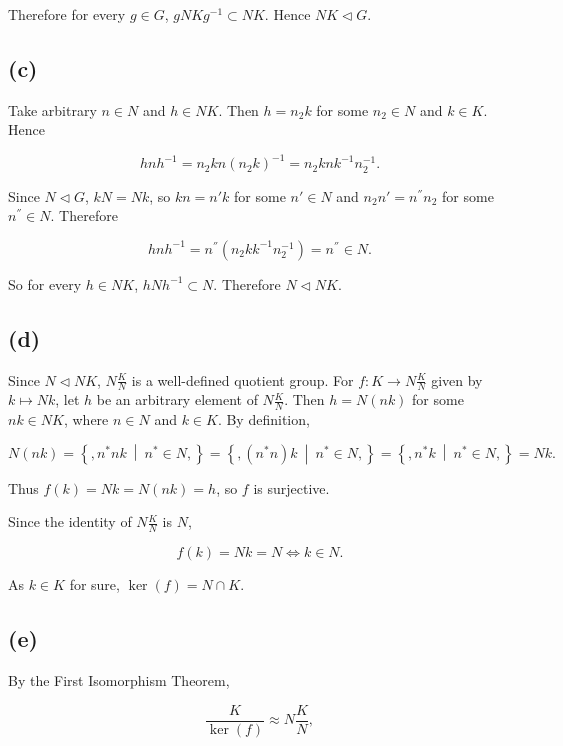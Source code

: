 Therefore for every \(g \in G\), \(gNKg^{- 1} \subset NK\). Hence \(NK \lhd G\).

\subsection{(c)}

Take arbitrary \(n \in N\) and \(h \in NK\). Then \(h = n_{2}k\) for some \(n_{2} \in N\) and \(k \in K\). Hence

\[hnh^{- 1} = n_{2}k{n\left( {n_{2}k} \right)}^{- 1} = n_{2}knk^{- 1}n_{2}^{- 1}.\]

Since \(N \lhd G\), \(kN = Nk\), so \(kn = n'k\) for some \(n' \in N\) and \(n_{2}n' = n^{''}n_{2}\) for some \(n^{''} \in N\). Therefore

\[hnh^{- 1} = n^{''}\left( {n_{2}kk^{- 1}n_{2}^{- 1}} \right) = n^{''} \in N.\]

So for every \(h \in NK\), \(hNh^{- 1} \subset N\). Therefore \(N \lhd NK\).

\subsection{(d)}

Since \(N \lhd NK\), \(N\frac{K}{N}\) is a well-defined quotient group. For \(f:K\rightarrow N\frac{K}{N}\) given by \(k\mapsto Nk\), let \(h\) be an arbitrary element of \(N\frac{K}{N}\). Then \(h = N\left( {nk} \right)\) for some \(nk \in NK\), where \(n \in N\) and \(k \in K\). By definition,

\[N\left( {nk} \right) = \left\{ ,n^{\ast}nk\  \middle| \ n^{\ast} \in N, \right\} = \left\{ ,\left( {n^{\ast}n} \right)k\  \middle| \ n^{\ast} \in N, \right\} = \left\{ ,n^{\ast}k\  \middle| \ n^{\ast} \in N, \right\} = Nk.\]

Thus \(f(k) = Nk = N\left( {nk} \right) = h\), so \(f\) is surjective.

Since the identity of \(N\frac{K}{N}\) is \(N\),

\[f(k) = Nk = N\Leftrightarrow k \in N.\]

As \(k \in K\) for sure, \(\ker(f) = N \cap K\).

\subsection{(e)}

By the First Isomorphism Theorem,

\[\frac{K}{\ker(f)} \approx N\frac{K}{N},\]

